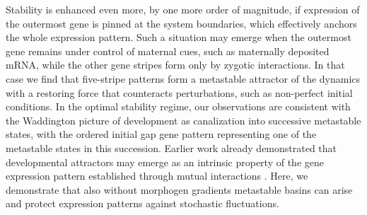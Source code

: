 \documentclass[a4paper,10pt]{article}
\newcommand{\TODO}[1]{\textcolor{blue}{\textbf{($\bigstar$ #1)}}}
\begin{document}
Stability is enhanced even more, by one more order of magnitude, if expression of the outermost gene is pinned at the system boundaries,
which effectively anchors the whole expression pattern.
Such a situation may emerge when the outermost gene remains under control of maternal cues, such as maternally deposited mRNA,
while the other gene stripes form only by zygotic interactions.
In that case we find that five-stripe patterns form a metastable attractor of the dynamics with a restoring force that counteracts perturbations, such as non-perfect initial conditions. 
In the optimal stability regime, 
our observations are consistent with the Waddington picture \cite{Waddington1942,Waddington1959} of development as canalization into successive metastable states, with the ordered initial gap gene pattern representing one of the metastable states in this succession.
Earlier work already demonstrated that developmental attractors may emerge as an intrinsic property of the gene expression pattern established through mutual interactions \cite{ Manu2009PlosBiol,Manu2009PlosCompBiol}.
Here, we demonstrate that also without morphogen gradients metastable basins can arise and protect expression patterns against stochastic fluctuations.

\end{document}
